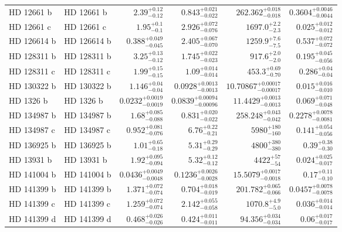 \begin{longtable*}{llrrrr}
HD 12661 b & HD 12661 b & $2.39^{+0.12}_{-0.12}$ & $0.843^{+0.021}_{-0.022}$ & $262.362^{+0.018}_{-0.018}$ & $0.3604^{+0.0046}_{-0.0044}$ \\ 
HD 12661 c & HD 12661 c & $1.95^{+0.1}_{-0.1}$ & $2.926^{+0.072}_{-0.076}$ & $1697.0^{+2.2}_{-2.3}$ & $0.025^{+0.012}_{-0.012}$ \\ 
HD 126614 b & HD 126614 b & $0.388^{+0.049}_{-0.045}$ & $2.405^{+0.067}_{-0.070}$ & $1259.9^{+7.6}_{-7.5}$ & $0.537^{+0.072}_{-0.072}$ \\ 
HD 128311 b & HD 128311 b & $3.25^{+0.13}_{-0.12}$ & $1.745^{+0.022}_{-0.023}$ & $917.6^{+2.0}_{-2.0}$ & $0.195^{+0.045}_{-0.056}$ \\ 
HD 128311 c & HD 128311 c & $1.99^{+0.15}_{-0.15}$ & $1.09^{+0.014}_{-0.014}$ & $453.3^{+0.69}_{-0.70}$ & $0.286^{+0.04}_{-0.04}$ \\ 
HD 130322 b & HD 130322 b & $1.146^{+0.04}_{-0.04}$ & $0.0928^{+0.0013}_{-0.0013}$ & $10.70867^{+0.00017}_{-0.00017}$ & $0.015^{+0.016}_{-0.010}$ \\ 
HD 1326 b & HD 1326 b & $0.0232^{+0.0019}_{-0.0019}$ & $0.0839^{+0.00094}_{-0.00096}$ & $11.4429^{+0.0013}_{-0.0013}$ & $0.069^{+0.071}_{-0.048}$ \\ 
HD 134987 b & HD 134987 b & $1.68^{+0.085}_{-0.088}$ & $0.831^{+0.020}_{-0.022}$ & $258.248^{+0.043}_{-0.042}$ & $0.2278^{+0.0078}_{-0.0081}$ \\ 
HD 134987 c & HD 134987 c & $0.952^{+0.081}_{-0.076}$ & $6.76^{+0.22}_{-0.21}$ & $5980^{+180}_{-160}$ & $0.141^{+0.054}_{-0.056}$ \\ 
HD 136925 b & HD 136925 b & $1.01^{+0.65}_{-0.18}$ & $5.31^{+0.29}_{-0.29}$ & $4800^{+380}_{-380}$ & $0.39^{+0.38}_{-0.30}$ \\ 
HD 13931 b & HD 13931 b & $1.92^{+0.095}_{-0.094}$ & $5.32^{+0.12}_{-0.12}$ & $4422^{+57}_{-54}$ & $0.024^{+0.025}_{-0.017}$ \\ 
HD 141004 b & HD 141004 b & $0.0436^{+0.0049}_{-0.0048}$ & $0.1236^{+0.0026}_{-0.0028}$ & $15.5079^{+0.0017}_{-0.0018}$ & $0.17^{+0.11}_{-0.10}$ \\ 
HD 141399 b & HD 141399 b & $1.371^{+0.072}_{-0.074}$ & $0.704^{+0.018}_{-0.019}$ & $201.782^{+0.065}_{-0.066}$ & $0.0457^{+0.0078}_{-0.0078}$ \\ 
HD 141399 c & HD 141399 c & $1.259^{+0.072}_{-0.074}$ & $2.142^{+0.055}_{-0.058}$ & $1070.8^{+4.9}_{-5.0}$ & $0.036^{+0.014}_{-0.014}$ \\ 
HD 141399 d & HD 141399 d & $0.468^{+0.026}_{-0.026}$ & $0.424^{+0.011}_{-0.011}$ & $94.356^{+0.034}_{-0.034}$ & $0.06^{+0.017}_{-0.017}$ \\ 

\end{longtable*}
